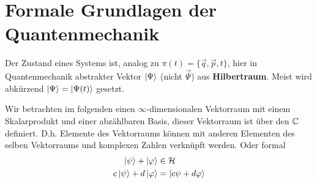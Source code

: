 \section{Formale Grundlagen der Quantenmechanik}
\begin{definition*}[Zustand]
	Der Zustand eines Systems ist, analog zu $\pi(t) = \{\vec{q}, \vec{p}, t\}$, hier in Quantenmechanik abstrakter Vektor $\ket{\Psi}$ (nicht $\vec{\Psi}$) aus \textbf{Hilbertraum}. Meist wird abkürzend $\ket{\Psi} = \ket{\Psi(t)}$ gesetzt.
\end{definition*}
\begin{definition*}[Hilbertraum]
	Wir betrachten im folgenden einen $\infty$-dimensionalen Vektorraum mit einem Skalarprodukt und einer abzählbaren Basis, dieser Vektorraum ist über den $\mathbb{C}$ definiert. D.h. Elemente des Vektorraums können mit anderen Elementen des selben Vektorraums und komplexen Zahlen verknüpft werden. Oder formal
	\begin{align*}
		\ket{\psi} + \ket{\varphi} &\in \mathcal{H}\\
		c \ket{\psi} + d \ket{\varphi} &= \ket{c \psi + d \varphi}
	\end{align*}


\end{definition*}
